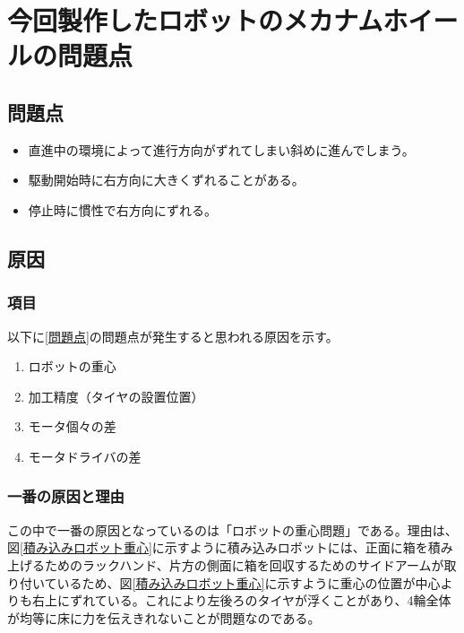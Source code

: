 \documentclass[12pt,oneside]{sotsuken_paper}
\begin{document}
\chapter{今回製作したロボットのメカナムホイールの問題点}

	\section{問題点}

	\begin{itemize}
		\item 直進中の環境によって進行方向がずれてしまい斜めに進んでしまう。
		\item 駆動開始時に右方向に大きくずれることがある。
		\item 停止時に慣性で右方向にずれる。
	\end{itemize}
	\label{問題点}

	\section{原因}

		\subsection{項目}
		以下に\ref{問題点}の問題点が発生すると思われる原因を示す。

		\begin{enumerate}
			\item ロボットの重心
			\item 加工精度（タイヤの設置位置）
			\item モータ個々の差
			\item モータドライバの差
		\end{enumerate}

		\subsection{一番の原因と理由}
		この中で一番の原因となっているのは「ロボットの重心問題」である。理由は、図\ref{積み込みロボット重心}に示すように積み込みロボットには、正面に箱を積み上げるためのラックハンド、片方の側面に箱を回収するためのサイドアームが取り付いているため、図\ref{積み込みロボット重心}に示すように重心の位置が中心よりも右上にずれている。これにより左後ろのタイヤが浮くことがあり、4輪全体が均等に床に力を伝えきれないことが問題なのである。
\end{document}
